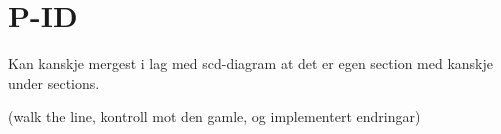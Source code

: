 \section{P-ID}
\thispagestyle{fancy}

Kan kanskje mergest i lag med scd-diagram at det er egen section med kanskje under sections.

(walk the line, kontroll mot den gamle, og implementert endringar)
